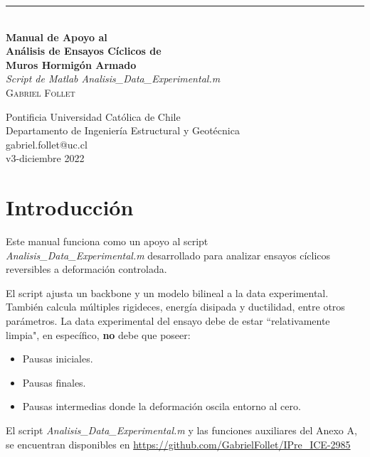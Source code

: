 \documentclass[a4paper, 11pt,article,oneside]{memoir}%
\begin{document}
\begin{titlingpage}
	\raggedleft %
	\rule{3 pt}{\textheight} %
	\hspace{0.05\textwidth} %
	\parbox[b]{0.9\textwidth}{ %
		
		{\\\Huge\bfseries Manual de Apoyo al 	\\[0.5\baselineskip] Análisis de Ensayos Cíclicos de  \\[0.5\baselineskip]  Muros Hormigón Armado}	\\[2\baselineskip] %
		{\large\textit{ Script de  Matlab \textit{Analisis_Data_Experimental.m}}}\\[4\baselineskip] %
		{\Large\textsc{Gabriel Follet}} %
      	\\[4\baselineskip] 
		
		
		\vspace{0.30\textheight} %
		
		{\noindent Pontificia Universidad Católica de Chile\\Departamento de Ingeniería Estructural y Geotécnica\\
		gabriel.follet@uc.cl\\
		v3-diciembre 2022} %
		}

\end{titlingpage}
\setsecheadstyle{\scshape\raggedright}
\setsubsecheadstyle{\scshape\raggedright}
\setsubsubsecheadstyle{\scshape\raggedright}
\tableofcontents
\newpage
\listoffigures
\newpage
\chapter{Introducción}
Este manual funciona como un apoyo al script \\ \textit{Analisis\_Data\_Experimental.m} desarrollado para analizar ensayos cíclicos reversibles a deformación controlada. \par
El script ajusta un backbone y un modelo bilineal a la data experimental. También calcula múltiples rigideces, energía disipada y ductilidad, entre otros parámetros.
La data experimental del ensayo debe de estar ``relativamente limpia", en específico, \textbf{no} debe que poseer: 
\begin{itemize}
    \item Pausas iniciales.
    \item Pausas finales.
    \item Pausas intermedias donde la deformación oscila entorno al cero. 
\end{itemize}
El script  \textit{Analisis\_Data\_Experimental.m} y las funciones auxiliares del Anexo A, se encuentran disponibles en \url{https://github.com/GabrielFollet/IPre_ICE-2985} 
\newpage
\end{document}
